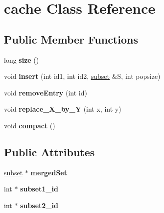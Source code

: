 \hypertarget{classcache}{\section{cache \-Class \-Reference}
\label{classcache}
}
\subsection*{\-Public \-Member \-Functions}
\begin{DoxyCompactItemize}
\item 
\hypertarget{classcache_ad421f486c4b9175d543e37d7d027a91b}{long {\bfseries size} ()}\label{classcache_ad421f486c4b9175d543e37d7d027a91b}

\item 
\hypertarget{classcache_a7732ce88e0266ff89d7185b1a1b32e49}{void {\bfseries insert} (int id1, int id2, \hyperlink{classsubset}{subset} \&\-S, int popsize)}\label{classcache_a7732ce88e0266ff89d7185b1a1b32e49}

\item 
\hypertarget{classcache_aca74af34f76b0da98363aecdf588fe3c}{void {\bfseries remove\-Entry} (int id)}\label{classcache_aca74af34f76b0da98363aecdf588fe3c}

\item 
\hypertarget{classcache_a1717120e014f6c1d893a5dd5dd131cc3}{void {\bfseries replace\-\_\-\-X\-\_\-by\-\_\-\-Y} (int x, int y)}\label{classcache_a1717120e014f6c1d893a5dd5dd131cc3}

\item 
\hypertarget{classcache_ad808d041270e327baa6822423bde00ee}{void {\bfseries compact} ()}\label{classcache_ad808d041270e327baa6822423bde00ee}

\end{DoxyCompactItemize}
\subsection*{\-Public \-Attributes}
\begin{DoxyCompactItemize}
\item 
\hypertarget{classcache_ad6a49f2623faa3cc2192a119429dd8cd}{\hyperlink{classsubset}{subset} $\ast$ {\bfseries merged\-Set}}\label{classcache_ad6a49f2623faa3cc2192a119429dd8cd}

\item 
\hypertarget{classcache_a74346ef8bdf9be47fb99478df9316fc6}{int $\ast$ {\bfseries subset1\-\_\-id}}\label{classcache_a74346ef8bdf9be47fb99478df9316fc6}

\item 
\hypertarget{classcache_a43596c2e6bcf38cca433b9ad356b1ce1}{int $\ast$ {\bfseries subset2\-\_\-id}}\label{classcache_a43596c2e6bcf38cca433b9ad356b1ce1}

\end{DoxyCompactItemize}

